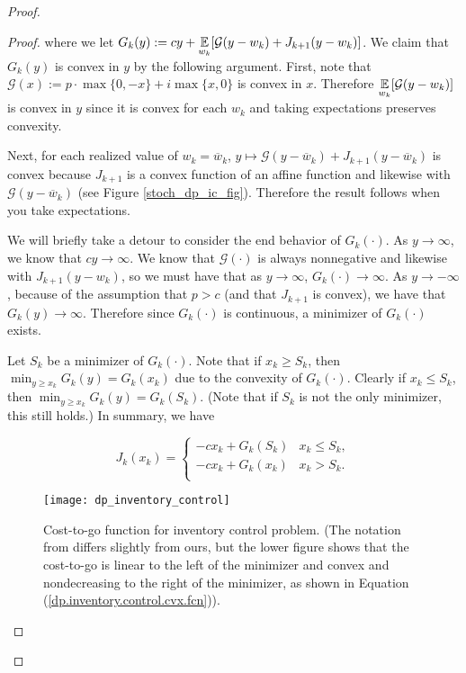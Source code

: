 \begin{proof}
\begin{proof}
where we let \(G_k(y) := cy + \underset{w_k}{\mathbb{E}}[ \mathcal{G}(y - w_k) + J_{k+1}(y - w_k)]  \). We claim that \(G_k(y)\) is convex in \(y\) by the following argument. First, note that \(\mathcal{G}(x) := p \cdot \max\{0, -x\} + i \max\{x, 0\}\) is convex in \(x\). Therefore \(\underset{w_k}{\mathbb{E}}[\mathcal{G}(y - w_k)]\) is convex in \(y\) since it is convex for each \(w_k\) and taking expectations preserves convexity. 

Next, for each realized value of \(w_k = \overline{w}_k\), \(y \mapsto \mathcal{G}(y - \overline{w}_k) + J_{k+1}(y - \overline{w}_k)\) is convex because \(J_{k+1}\) is a convex function of an affine function and likewise with \(\mathcal{G}(y - \overline{w}_k)\) (see Figure \ref{stoch_dp_ic_fig}). Therefore the result follows when you take expectations.

We will briefly take a detour to consider the end behavior of \(G_k(\cdot)\). As \(y \to \infty\), we know that \(cy \to \infty\). We know that \(\mathcal{G}(\cdot)\) is always nonnegative and likewise with \(J_{k+1}(y - w_k)\), so we must have that as \(y \to \infty\), \(G_k(\cdot) \to \infty\). As \(y \to -\infty\), because of the assumption that \(p > c\) (and that \(J_{k+1}\) is convex), we have that \(G_k(y) \to \infty\). Therefore since \(G_k(\cdot)\) is continuous, a minimizer of \(G_k(\cdot)\) exists. 

Let \(S_k\) be a minimizer of \(G_k(\cdot)\). Note that if \(x_k \geq S_k\), then \(\min_{y \geq x_k} G_k(y) = G_k(x_k)\) due to the convexity of \(G_k(\cdot)\). Clearly if \(x_k \leq S_k\), then \(\min_{y \geq x_k} G_k(y) = G_k(S_k)\). (Note that if \(S_k\) is not the only minimizer, this still holds.) In summary, we have

\begin{equation}\label{dp.inventory.control.cvx.fcn}
J_k(x_k) = \begin{cases}
-c x_k +  G_k(S_k)  & x_k \leq S_k ,\\
-c x_k +  G_k(x_k)  & x_k > S_k .\\
\end{cases}
\end{equation}

\begin{figure}[htbp]
\begin{center}
\texttt{[image: dp\_inventory\_control]}
\caption{Cost-to-go function for inventory control problem. (The notation from \citet{v1_bertsekas2012dynamic} differs slightly from ours, but the lower figure shows that the cost-to-go is linear to the left of the minimizer and convex and nondecreasing to the right of the minimizer, as shown in Equation (\ref{dp.inventory.control.cvx.fcn})).}
\label{dp_inventory_control_fig}
\end{center}
\end{figure}



\end{proof}
\end{proof}
